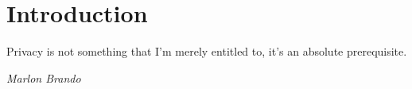 
\chapter{Introduction}
\label{ch:Introduction}

\begin{fancyquotes}
Privacy is not something that I’m merely entitled to, it’s an absolute prerequisite. 

\textit{Marlon Brando}
\end{fancyquotes}

